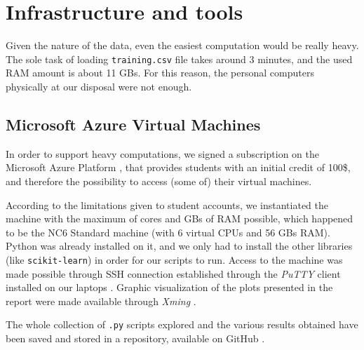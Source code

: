 \chapter{Infrastructure and tools}
\label{capitolo4}
\thispagestyle{empty}

\noindent Given the nature of the data, even the easiest computation would be really heavy. The sole task of loading \texttt{training.csv} file takes around 3 minutes, and the used RAM amount is about 11 GBs. For this reason, the personal computers physically at our disposal were not enough.

\section[Microsoft Azure VMs]{Microsoft Azure Virtual Machines}
In order to support heavy computations, we signed a subscription on the Microsoft Azure Platform \cite{azure}, that provides students with an initial credit of 100\$, and therefore the possibility to access (some of) their virtual machines.


According to the limitations given to student accounts, we instantiated the machine with the maximum of cores and GBs of RAM possible, which happened to be the NC6 Standard machine (with 6 virtual CPUs and 56 GBs RAM). Python was already installed on it, and we only had to install the other libraries (like \texttt{scikit-learn}) in order for our scripts to run. Access to the machine was made possible through SSH connection established through the \textit{PuTTY} client installed on our laptops \cite{putty}. Graphic visualization of the plots presented in the report were made available through \textit{Xming} \cite{xming}.


The whole collection of \texttt{.py} scripts explored and the various results obtained have been saved and stored in a repository, available on GitHub \cite{github}.